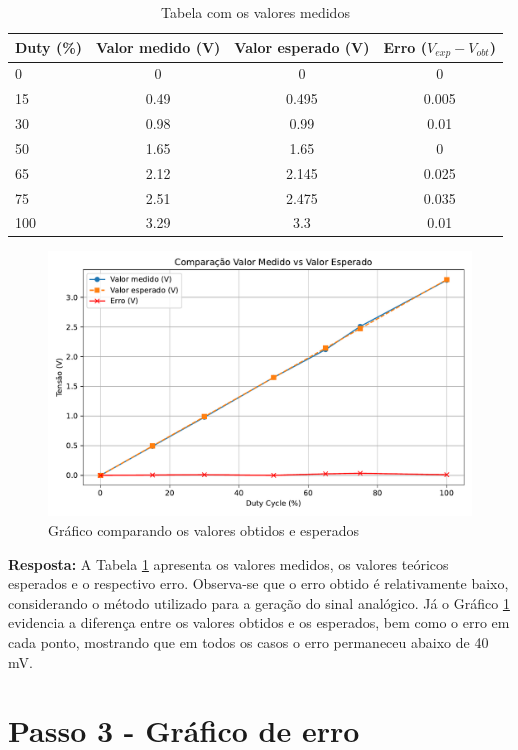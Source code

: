\documentclass{article}
\begin{document}
\begin{table}[ht!]
    \centering
    \begin{tabular}{|l|c|c|c|}
        \toprule
        Duty (\%) & Valor medido (V)& Valor esperado (V) & Erro ($V_{exp} - V_{obt}$) \\
        \midrule
        0 & 0 & 0 & 0 \\
        15 & 0.49 & 0.495 & 0.005 \\
        30 & 0.98 & 0.99 & 0.01 \\
        50 & 1.65 & 1.65 & 0 \\
        65 & 2.12 & 2.145 & 0.025 \\
        75 & 2.51 & 2.475 & 0.035 \\
        100 & 3.29 & 3.3 & 0.01  \\
         \bottomrule
    \end{tabular}
    \caption{Tabela com os valores medidos}
    \label{tab:medidas}
\end{table}

\begin{figure}[H]
    \centering
    \includegraphics[width=0.8\linewidth]{grafico_duty.pdf}
    \caption{Gráfico comparando os valores obtidos e esperados}
    \label{fig:grafico}
\end{figure}

\noindent
\textbf{Resposta:} A Tabela \ref{tab:medidas} apresenta os valores medidos, os valores teóricos esperados e o respectivo erro. Observa-se que o erro obtido é relativamente baixo, considerando o método utilizado para a geração do sinal analógico. Já o Gráfico \ref{fig:grafico} evidencia a diferença entre os valores obtidos e os esperados, bem como o erro em cada ponto, mostrando que em todos os casos o erro permaneceu abaixo de 40 mV.

\section{Passo 3 - Gráfico de erro}
\end{document}
